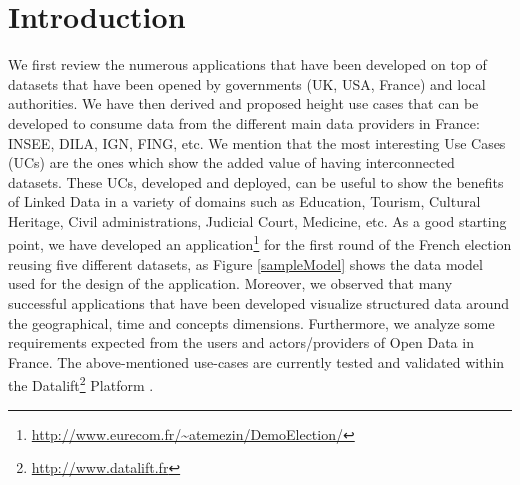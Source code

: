 \documentclass[a4paper,11pt]{report}
\begin{document}
\section{Introduction}
We first review the numerous applications that have been developed on top of datasets that have been opened by governments (UK, USA, France) and local authorities. We have then derived and proposed height use cases  that can be developed to consume data from the different main data providers in France: INSEE, DILA, IGN, FING, etc. We mention that the most interesting Use Cases (UCs) are the ones which show the added value of having interconnected datasets. These UCs,  developed and deployed, can be useful to show the benefits of Linked Data in a variety of domains such as Education, Tourism, Cultural Heritage, Civil administrations, Judicial Court, Medicine, etc. As a good starting point, we have developed an application\footnote{\url{http://www.eurecom.fr/~atemezin/DemoElection/}} for the first round of the French election reusing five different datasets, as Figure \ref{sampleModel} shows the data model used for the design of the application. Moreover, we observed that many successful applications that have been developed visualize structured data around the geographical, time and concepts dimensions. Furthermore, we analyze some requirements expected from the users and actors/providers of Open Data in France. The above-mentioned use-cases are currently tested and validated within the Datalift\footnote{\url{http://www.datalift.fr}} Platform \cite{datalift2012}.
\end{document}
